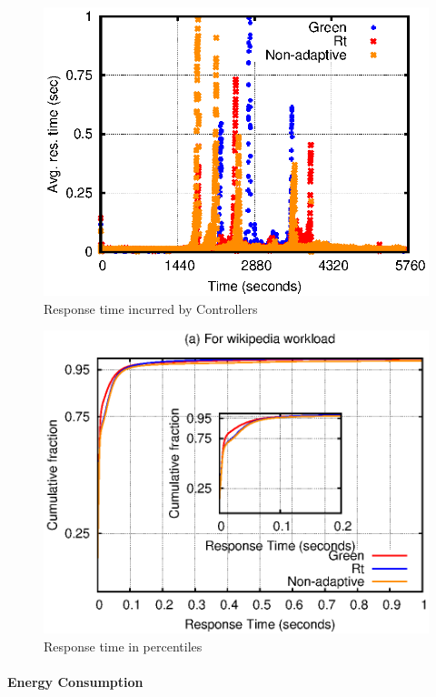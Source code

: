 \begin{figure} [htb]
\centering
\includegraphics[scale=.8]{Graphs/response_time.eps}
\caption{Response time incurred by Controllers}
\label{fig:rt}
\end{figure}


\begin{figure} [htb]
\centering
\includegraphics[scale=.75]{Graphs/percentile.eps}
\caption{Response time in percentiles}
\label{fig:perc}
\end{figure}

\paragraph*{\textbf{Energy Consumption}}

